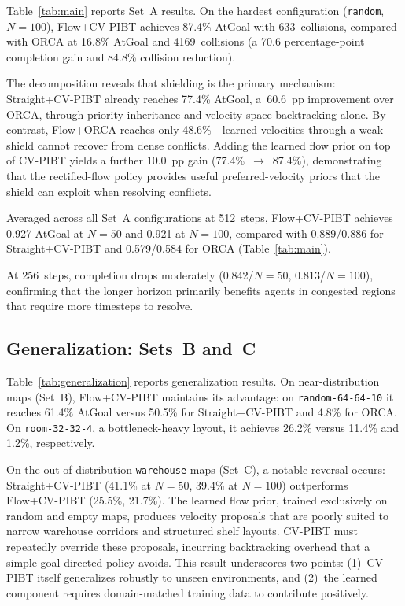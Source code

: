 Table~\ref{tab:main} reports Set~A results.
On the hardest configuration (\texttt{random}, $N\!=\!100$),
Flow+CV-PIBT achieves 87.4\% AtGoal with 633~collisions,
compared with ORCA at 16.8\% AtGoal and 4169~collisions
(a 70.6 percentage-point completion gain and 84.8\% collision reduction).

The decomposition reveals that shielding is the primary mechanism:
Straight+CV-PIBT already reaches 77.4\% AtGoal,
a~60.6~pp improvement over ORCA, through priority inheritance
and velocity-space backtracking alone.
By contrast, Flow+ORCA reaches only 48.6\%---learned velocities
through a weak shield cannot recover from dense conflicts.
Adding the learned flow prior on top of CV-PIBT yields a
further 10.0~pp gain (77.4\%~$\to$~87.4\%), demonstrating that
the rectified-flow policy provides useful preferred-velocity
priors that the shield can exploit when resolving conflicts.

Averaged across all Set~A configurations at 512~steps,
Flow+CV-PIBT achieves 0.927 AtGoal at $N\!=\!50$ and 0.921 at $N\!=\!100$,
compared with 0.889/0.886 for Straight+CV-PIBT and
0.579/0.584 for ORCA (Table~\ref{tab:main}).

At 256~steps, completion drops moderately
(0.842/$N\!=\!50$, 0.813/$N\!=\!100$),
confirming that the longer horizon primarily benefits
agents in congested regions that require more timesteps to resolve.

\subsection{Generalization: Sets~B and~C}\label{sec:gen}

Table~\ref{tab:generalization} reports generalization results.
On near-distribution maps (Set~B), Flow+CV-PIBT maintains
its advantage: on \texttt{random-64-64-10} it reaches 61.4\% AtGoal
versus 50.5\% for Straight+CV-PIBT and 4.8\% for ORCA.
On \texttt{room-32-32-4}, a bottleneck-heavy layout, it achieves
26.2\% versus 11.4\% and 1.2\%, respectively.

On the out-of-distribution \texttt{warehouse} maps (Set~C),
a notable reversal occurs:
Straight+CV-PIBT (41.1\% at $N\!=\!50$, 39.4\% at $N\!=\!100$)
outperforms Flow+CV-PIBT (25.5\%, 21.7\%).
The learned flow prior, trained exclusively on random and empty maps,
produces velocity proposals that are poorly suited to narrow warehouse
corridors and structured shelf layouts.
CV-PIBT must repeatedly override these proposals, incurring
backtracking overhead that a simple goal-directed policy avoids.
This result underscores two points:
(1)~CV-PIBT itself generalizes robustly to unseen environments,
and (2)~the learned component requires domain-matched training data
to contribute positively.

